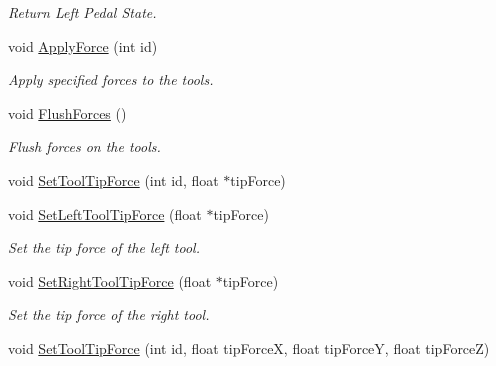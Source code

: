\begin{DoxyCompactItemize}
\begin{DoxyCompactList}\small\item\em Return Left Pedal State. \item\end{DoxyCompactList}\item 
\hypertarget{classvtkIHP_a541bcaa9e51b0a6a8b727ba8c7fbfc82}{
void \hyperlink{classvtkIHP_a541bcaa9e51b0a6a8b727ba8c7fbfc82}{ApplyForce} (int id)}
\label{classvtkIHP_a541bcaa9e51b0a6a8b727ba8c7fbfc82}

\begin{DoxyCompactList}\small\item\em Apply specified forces to the tools. \item\end{DoxyCompactList}\item 
\hypertarget{classvtkIHP_a2e8f7a4172f259517554b3779b3b08b2}{
void \hyperlink{classvtkIHP_a2e8f7a4172f259517554b3779b3b08b2}{FlushForces} ()}
\label{classvtkIHP_a2e8f7a4172f259517554b3779b3b08b2}

\begin{DoxyCompactList}\small\item\em Flush forces on the tools. \item\end{DoxyCompactList}\item 
void \hyperlink{classvtkIHP_a6d991672b0fa06861ecc7e7efcfd5b98}{SetToolTipForce} (int id, float $\ast$tipForce)
\item 
\hypertarget{classvtkIHP_ad39a01ad20cc9eab9fca84979f211653}{
void \hyperlink{classvtkIHP_ad39a01ad20cc9eab9fca84979f211653}{SetLeftToolTipForce} (float $\ast$tipForce)}
\label{classvtkIHP_ad39a01ad20cc9eab9fca84979f211653}

\begin{DoxyCompactList}\small\item\em Set the tip force of the left tool. \item\end{DoxyCompactList}\item 
\hypertarget{classvtkIHP_a413aeb8d1cee56b4b0460757d2622a8f}{
void \hyperlink{classvtkIHP_a413aeb8d1cee56b4b0460757d2622a8f}{SetRightToolTipForce} (float $\ast$tipForce)}
\label{classvtkIHP_a413aeb8d1cee56b4b0460757d2622a8f}

\begin{DoxyCompactList}\small\item\em Set the tip force of the right tool. \item\end{DoxyCompactList}\item 
\hypertarget{classvtkIHP_ad1d9fa9dfce5ea9576ee83bfea54db6d}{
void \hyperlink{classvtkIHP_ad1d9fa9dfce5ea9576ee83bfea54db6d}{SetToolTipForce} (int id, float tipForceX, float tipForceY, float tipForceZ)}
\label{classvtkIHP_ad1d9fa9dfce5ea9576ee83bfea54db6d}


\end{DoxyCompactItemize}
